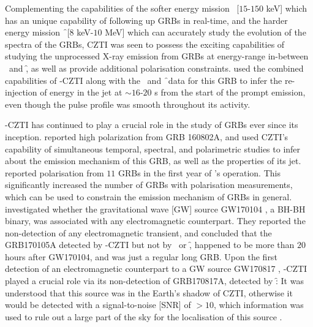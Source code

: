 Complementing the capabilities of the softer energy mission \s\ [$15$-$150$ keV] which has an unique capability of following up GRBs in real-time, and the harder energy mission \f\ [$8$ keV-$10$ MeV] which can accurately study the evolution of the spectra of the GRBs, CZTI was seen to possess the exciting capabilities of studying the unprocessed X-ray emission from GRBs at energy-range in-between \s\ and \f, as well as provide additional polarisation constraints. \cite{Basak_et_al.-2017-MNRAS} used the combined capabilities of \AS -CZTI along with the \s\ and \f\ data for this GRB to infer the re-injection of energy in the jet at $\sim 16$-$20$ s from the start of the prompt emission, even though the pulse profile was smooth throughout its activity.

\AS -CZTI has continued to play a crucial role in the study of GRBs ever since its inception. \cite{Chand_et_al.-2018-ApJ} reported high polarization from GRB 160802A, and used CZTI's capability of simultaneous temporal,  spectral, and polarimetric studies to infer about the emission mechanism of this GRB, as well as the properties of its jet. \cite{Chattopadhyay_et_al.-2017-arXiv} reported polarisation from $11$ GRBs in the first year of \AS 's operation. This significantly increased the number of GRBs with polarisation measurements, which can be used to constrain the emission mechanism of GRBs in general. \cite{Bhalerao_et_al.-2017-ApJ-A_Tale_of_Two_Transients} investigated whether the gravitational wave [GW] source GW170104 \citep{GW170104-2017}, a BH-BH binary, was associated with any electromagnetic counterpart. They reported the non-detection of any electromagnetic transient, and concluded that the GRB170105A detected by \AS -CZTI but not by \s\ or \f,  happened to be more than $20$ hours after GW170104, and was just a regular long GRB. Upon the first detection of an electromagnetic counterpart to a GW source GW170817 \citep{GW170817-2017, EM170817-2017}, \AS -CZTI played a crucial role via its non-detection of GRB170817A, detected by \f: It was understood that this source was in the Earth's shadow of CZTI, otherwise it would be detected with a signal-to-noise [SNR] of $> 10$, which information was used to rule out a large part of the sky for the localisation of this source \citep{Kasliwal_et_al.-2017-Science}.

